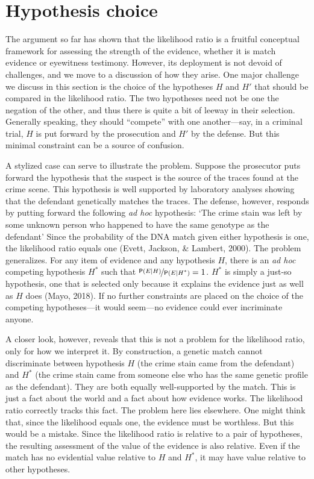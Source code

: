 \documentclass[
  10pt,
  dvipsnames,enabledeprecatedfontcommands]{scrartcl}
\newcommand{\pr}[1]{\mathsf{P}(#1)}
\begin{document}
\hypertarget{hypothesis-choice}{%
\section{\texorpdfstring{Hypothesis choice
\label{sec:hchoice}}{Hypothesis choice }}\label{hypothesis-choice}}

The argument so far has shown that the likelihood ratio is a fruitful
conceptual framework for assessing the strength of the evidence, whether
it is match evidence or eyewitness testimony. However, its deployment is
not devoid of challenges, and we move to a discussion of how they arise.
One major challenge we discuss in this section is the choice of the
hypotheses \(H\) and \(H'\) that should be compared in the likelihood
ratio. The two hypotheses need not be one the negation of the other, and
thus there is quite a bit of leeway in their selection. Generally
speaking, they should ``compete'' with one another---say, in a criminal
trial, \(H\) is put forward by the prosecution and \(H'\) by the
defense. But this minimal constraint can be a source of confusion.

A stylized case can serve to illustrate the problem. Suppose the
prosecutor puts forward the hypothesis that the suspect is the source of
the traces found at the crime scene. This hypothesis is well supported
by laboratory analyses showing that the defendant genetically matches
the traces. The defense, however, responds by putting forward the
following \textit{ad hoc} hypothesis: `The crime stain was left by some
unknown person who happened to have the same genotype as the defendant'
Since the probability of the DNA match given either hypothesis is one,
the likelihood ratio equals one (Evett, Jackson, \& Lambert, 2000). The
problem generalizes. For any item of evidence and any hypothesis \(H\),
there is an \textit{ad hoc} competing hypothesis \(H^*\) such that
\(\nicefrac{\pr{E \vert H}}{\pr{E \vert H^*}}=1\). \(H^*\) is simply a
just-so hypothesis, one that is selected only because it explains the
evidence just as well as \(H\) does (Mayo, 2018). If no further
constraints are placed on the choice of the competing hypotheses---it
would seem---no evidence could ever incriminate anyone.

A closer look, however, reveals that this is not a problem for the
likelihood ratio, only for how we interpret it. By construction, a
genetic match cannot discriminate between hypothesis \(H\) (the crime
stain came from the defendant) and \(H^*\) (the crime stain came from
someone else who has the same genetic profile as the defendant). They
are both equally well-supported by the match. This is just a fact about
the world and a fact about how evidence works. The likelihood ratio
correctly tracks this fact. The problem here lies elsewhere. One might
think that, since the likelihood equals one, the evidence must be
worthless. But this would be a mistake. Since the likelihood ratio is
relative to a pair of hypotheses, the resulting assessment of the value
of the evidence is also relative. Even if the match has no evidential
value relative to \(H\) and \(H^*\), it may have value relative to other
hypotheses.
\end{document}

